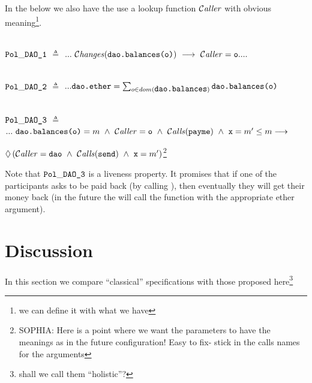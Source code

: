 \documentclass[acmsmall,screen]{acmart}
\begin{document}
In the below we also have the use a lookup function ${\mathcal{C}}\textrm{\textit{aller}}$ with obvious meaning\footnote{we can define it with what we have}.

~ \\
\noindent
${{\mbox{\tt{Pol}}}\_{{\mbox{\tt{DAO\_1}}}}}$ $\triangleq$ $ ...\ \Changes{\prg{dao.balances(o)}}\  \longrightarrow\   \Caller=\prg{o} ....$

~ \\
\noindent
${{\mbox{\tt{Pol}}}\_{{\mbox{\tt{DAO\_2}}}}}$ $\triangleq$ $ ... {\mbox{\tt{dao.ether}}}=\sum_{o\in dom({\mbox{\tt{dao.balances}}})}  {\mbox{\tt{dao.balances(o)}}}$

~ \\
\noindent
${{\mbox{\tt{Pol}}}\_{{\mbox{\tt{DAO\_3}}}}}$ $\triangleq$ $... \ \prg{dao.balances(o)}=m \ \wedge\ \Caller = \prg{o}\ \wedge\ \Calls{payme} \ \wedge\ \prg{x}=m'\leq m  \longrightarrow  $\\
\strut \hspace{5cm}
$\Future{(\Caller=\prg{dao}\ \wedge\ \Calls{send} \ \wedge\  \prg{x}=m')}$\footnote{SOPHIA: Here is a point where we
want the parameters to have the meanings as in the future configuration! Easy to fix- stick in the calls names for the arguments}

Note that ${{\mbox{\tt{Pol}}}\_{{\mbox{\tt{DAO\_3}}}}}$ is a liveness property. It promises that if one of the  participants asks to be paid back
(by calling ), then eventually they will get their money back (in the future the  will call the function 
with the appropriate ether argument).


\section{Discussion}
In this section we compare ``classical'' specifications with those proposed here\footnote{shall we call them ``holistic''?}
\end{document}
